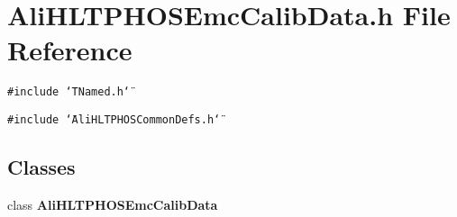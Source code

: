 \section{Ali\-HLTPHOSEmc\-Calib\-Data.h File Reference}
\label{AliHLTPHOSEmcCalibData_8h}


{\tt \#include \char`\"{}TNamed.h\char`\"{}}\par
{\tt \#include \char`\"{}Ali\-HLTPHOSCommon\-Defs.h\char`\"{}}\par
\subsection*{Classes}
\begin{CompactItemize}
\item 
class {\bf Ali\-HLTPHOSEmc\-Calib\-Data}
\end{CompactItemize}
